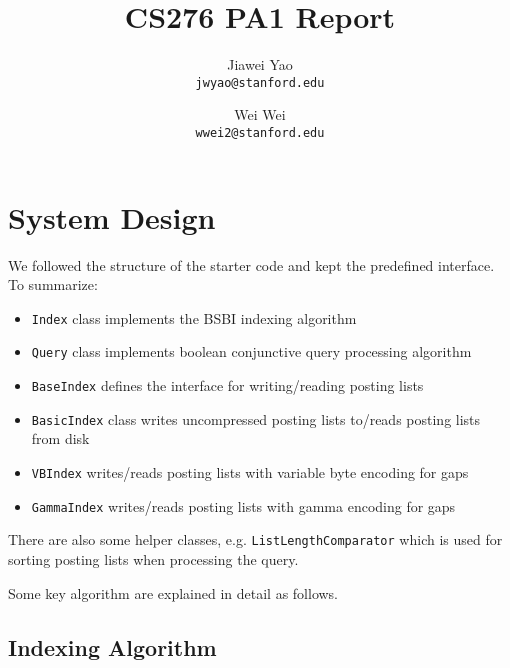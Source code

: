 \documentclass{article}
\begin{document}
\title{CS276 PA1 Report}

\author{
  Jiawei Yao\\
  \texttt{jwyao@stanford.edu}
  \and
  Wei Wei\\
  \texttt{wwei2@stanford.edu}
}

\maketitle

\section{System Design}

We followed the structure of the starter code and kept the predefined
interface. To summarize:
\begin{itemize}
  \item \texttt{Index} class implements the BSBI indexing algorithm
  
  \item \texttt{Query} class implements boolean conjunctive query
  processing algorithm
  
  \item \texttt{BaseIndex} defines the interface for writing/reading
  posting lists
  
  \item \texttt{BasicIndex} class writes uncompressed posting lists
  to/reads posting lists from disk
  
  \item \texttt{VBIndex} writes/reads posting lists with variable byte
  encoding for gaps
  
  \item \texttt{GammaIndex} writes/reads posting lists with gamma encoding
  for gaps
\end{itemize}
There are also some helper classes, e.g. \texttt{ListLengthComparator}
which is used for sorting posting lists when processing the query.

Some key algorithm are explained in detail as follows.

\subsection{Indexing Algorithm}
\end{document}
